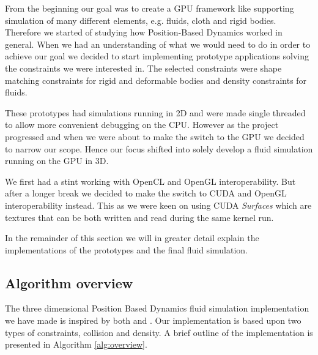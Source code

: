From the beginning our goal was to create a GPU framework like \cite{macklin2014unified} supporting simulation of many different elements, e.g. fluids, cloth and rigid bodies. Therefore we started of studying how Position-Based Dynamics worked in general. When we had an understanding of what we would need to do in order to achieve our goal we decided to start implementing prototype applications solving the constraints we were interested in. The selected constraints were shape matching constraints for rigid and deformable bodies and density constraints for fluids. 

These prototypes had simulations running in 2D and were made single threaded to allow more convenient debugging on the CPU. However as the project progressed and when we were about to make the switch to the GPU we decided to narrow our scope. Hence our focus shifted into solely develop a fluid simulation running on the GPU in 3D.

We first had a stint working with OpenCL and OpenGL interoperability. But after a longer break we decided to make the switch to CUDA and OpenGL interoperability instead. This as we were keen on using CUDA \textit{Surfaces} which are textures that can be both written and read during the same kernel run.

In the remainder of this section we will in greater detail explain the implementations of the prototypes and the final fluid simulation.

\subsection{Algorithm overview}

The three dimensional Position Based Dynamics fluid simulation implementation we have made is inspired by both \cite{macklin2013position} and \cite{macklin2014unified}. Our implementation is based upon two types of constraints, collision and density. A brief outline of the implementation is presented in Algorithm \ref{alg:overview}.

